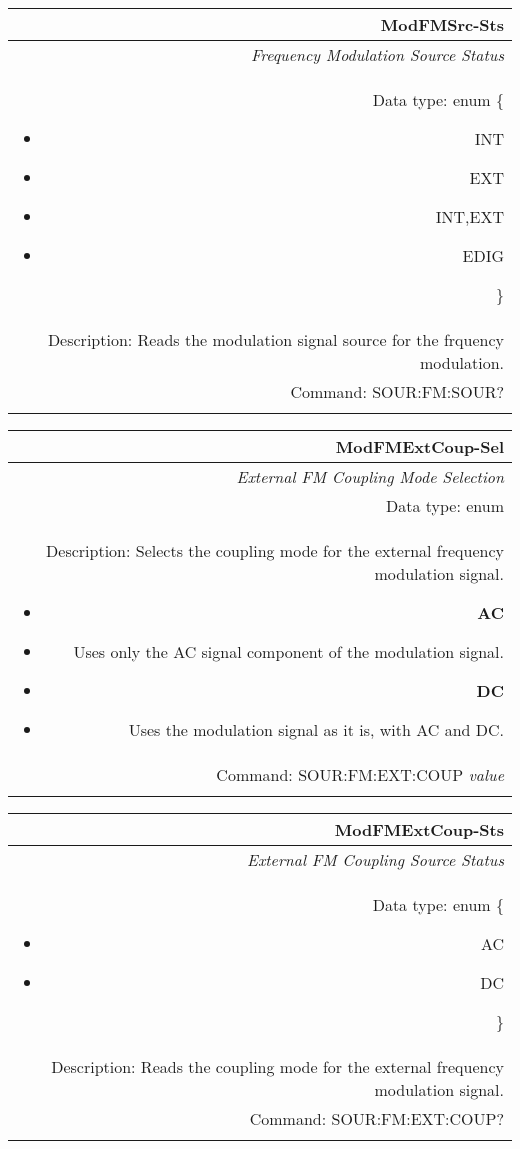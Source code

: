 \documentclass[openany]{article}
\begin{document}
		\begin{tabular}{N}
			\hline
			\bfseries ModFMSrc-Sts \\ \hline
			\emph{Frequency Modulation Source Status} \\
			Data type: enum \{\begin{itemize}[noitemsep]
				\small
				\item[] INT
				\item[] EXT
				\item[] INT,EXT
				\item[] EDIG
			\end{itemize}\} \\ 
			Description: Reads the modulation signal source for the frquency modulation. \\
			Command: SOUR:FM:SOUR? \\
			\\

		\end{tabular}


		\begin{tabular}{N}
			\hline
			\bfseries ModFMExtCoup-Sel \\ \hline
			\emph{External FM Coupling Mode Selection} \\
			Data type: enum \\  
			Description: Selects the coupling mode for the external frequency modulation signal.\begin{itemize}[noitemsep]
				\small
				\item[] \textbf{AC}
				\item[] Uses only the AC signal component of the modulation signal.
				\item[] \textbf{DC}
				\item[] Uses the modulation signal as it is, with AC and DC.	
			\end{itemize} \\
			Command: SOUR:FM:EXT:COUP \emph{value} \\
			\\

		\end{tabular}


		\begin{tabular}{N}
			\hline
			\bfseries ModFMExtCoup-Sts \\ \hline
			\emph{External FM Coupling Source Status} \\
			Data type: enum \{\begin{itemize}[noitemsep]
				\small
				\item[] AC
				\item[] DC
			\end{itemize}\} \\ 
			Description: Reads the coupling mode for the external frequency modulation signal. \\
			Command: SOUR:FM:EXT:COUP? \\
			\\

		\end{tabular}
\end{document}
